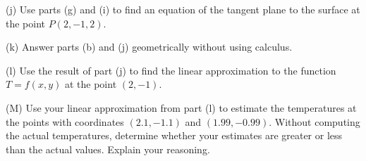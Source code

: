 \documentclass{ximera}
\begin{document}
\begin{example}
(j) Use parts (g) and (i) to find an equation of the tangent plane to the surface at the point $P(2,-1,2)$.

(k) Answer parts (b) and (j) geometrically without using calculus.

(l) Use the result of part (j) to find the linear approximation to the function $T=f(x,y)$ at the point $(2,-1)$.

(M) Use your linear approximation from part (l) to estimate the temperatures at the points with coordinates $(2.1, -1.1)$ and $(1.99, -0.99)$. Without computing the actual temperatures, determine whether your estimates are greater or less than the actual values. Explain your reasoning.

\end{example}
\end{document}
